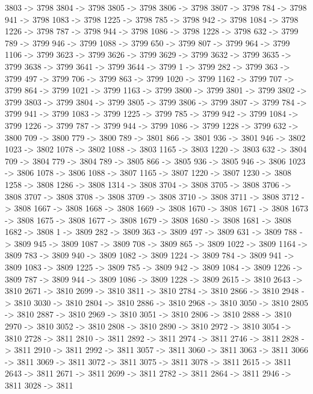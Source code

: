 {	3803 -> 3798
	3804 -> 3798
	3805 -> 3798
	3806 -> 3798
	3807 -> 3798
	784 -> 3798
	941 -> 3798
	1083 -> 3798
	1225 -> 3798
	785 -> 3798
	942 -> 3798
	1084 -> 3798
	1226 -> 3798
	787 -> 3798
	944 -> 3798
	1086 -> 3798
	1228 -> 3798
	632 -> 3799
	789 -> 3799
	946 -> 3799
	1088 -> 3799
	650 -> 3799
	807 -> 3799
	964 -> 3799
	1106 -> 3799
	3623 -> 3799
	3626 -> 3799
	3629 -> 3799
	3632 -> 3799
	3635 -> 3799
	3638 -> 3799
	3641 -> 3799
	3644 -> 3799
	1 -> 3799
	282 -> 3799
	363 -> 3799
	497 -> 3799
	706 -> 3799
	863 -> 3799
	1020 -> 3799
	1162 -> 3799
	707 -> 3799
	864 -> 3799
	1021 -> 3799
	1163 -> 3799
	3800 -> 3799
	3801 -> 3799
	3802 -> 3799
	3803 -> 3799
	3804 -> 3799
	3805 -> 3799
	3806 -> 3799
	3807 -> 3799
	784 -> 3799
	941 -> 3799
	1083 -> 3799
	1225 -> 3799
	785 -> 3799
	942 -> 3799
	1084 -> 3799
	1226 -> 3799
	787 -> 3799
	944 -> 3799
	1086 -> 3799
	1228 -> 3799
	632 -> 3800
	709 -> 3800
	779 -> 3800
	789 -> 3801
	866 -> 3801
	936 -> 3801
	946 -> 3802
	1023 -> 3802
	1078 -> 3802
	1088 -> 3803
	1165 -> 3803
	1220 -> 3803
	632 -> 3804
	709 -> 3804
	779 -> 3804
	789 -> 3805
	866 -> 3805
	936 -> 3805
	946 -> 3806
	1023 -> 3806
	1078 -> 3806
	1088 -> 3807
	1165 -> 3807
	1220 -> 3807
	1230 -> 3808
	1258 -> 3808
	1286 -> 3808
	1314 -> 3808
	3704 -> 3808
	3705 -> 3808
	3706 -> 3808
	3707 -> 3808
	3708 -> 3808
	3709 -> 3808
	3710 -> 3808
	3711 -> 3808
	3712 -> 3808
	1667 -> 3808
	1668 -> 3808
	1669 -> 3808
	1670 -> 3808
	1671 -> 3808
	1673 -> 3808
	1675 -> 3808
	1677 -> 3808
	1679 -> 3808
	1680 -> 3808
	1681 -> 3808
	1682 -> 3808
	1 -> 3809
	282 -> 3809
	363 -> 3809
	497 -> 3809
	631 -> 3809
	788 -> 3809
	945 -> 3809
	1087 -> 3809
	708 -> 3809
	865 -> 3809
	1022 -> 3809
	1164 -> 3809
	783 -> 3809
	940 -> 3809
	1082 -> 3809
	1224 -> 3809
	784 -> 3809
	941 -> 3809
	1083 -> 3809
	1225 -> 3809
	785 -> 3809
	942 -> 3809
	1084 -> 3809
	1226 -> 3809
	787 -> 3809
	944 -> 3809
	1086 -> 3809
	1228 -> 3809
	2615 -> 3810
	2643 -> 3810
	2671 -> 3810
	2699 -> 3810
	3811 -> 3810
	2784 -> 3810
	2866 -> 3810
	2948 -> 3810
	3030 -> 3810
	2804 -> 3810
	2886 -> 3810
	2968 -> 3810
	3050 -> 3810
	2805 -> 3810
	2887 -> 3810
	2969 -> 3810
	3051 -> 3810
	2806 -> 3810
	2888 -> 3810
	2970 -> 3810
	3052 -> 3810
	2808 -> 3810
	2890 -> 3810
	2972 -> 3810
	3054 -> 3810
	2728 -> 3811
	2810 -> 3811
	2892 -> 3811
	2974 -> 3811
	2746 -> 3811
	2828 -> 3811
	2910 -> 3811
	2992 -> 3811
	3057 -> 3811
	3060 -> 3811
	3063 -> 3811
	3066 -> 3811
	3069 -> 3811
	3072 -> 3811
	3075 -> 3811
	3078 -> 3811
	2615 -> 3811
	2643 -> 3811
	2671 -> 3811
	2699 -> 3811
	2782 -> 3811
	2864 -> 3811
	2946 -> 3811
	3028 -> 3811
}
